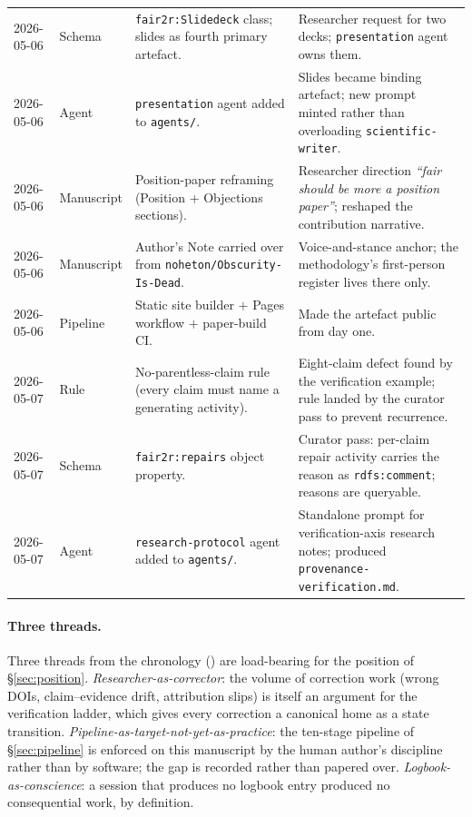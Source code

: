 \begin{longtable}{@{}p{1.55cm}p{1.4cm}p{4.2cm}p{6.6cm}@{}}
2026-05-06 & Schema     & \texttt{fair2r:Slidedeck} class; slides as fourth primary artefact. & Researcher request for two decks; \texttt{presentation} agent owns them. \\
2026-05-06 & Agent      & \texttt{presentation} agent added to \texttt{agents/}. & Slides became binding artefact; new prompt minted rather than overloading \texttt{scientific-writer}. \\
2026-05-06 & Manuscript & Position-paper reframing (Position + Objections sections). & Researcher direction \emph{``fair should be more a position paper''}; reshaped the contribution narrative. \\
2026-05-06 & Manuscript & Author's Note carried over from \texttt{noheton/Obscurity-Is-Dead}. & Voice-and-stance anchor; the methodology's first-person register lives there only. \\
2026-05-06 & Pipeline   & Static site builder \(+\) Pages workflow \(+\) paper-build CI. & Made the artefact public from day one. \\
2026-05-07 & Rule       & No-parentless-claim rule (every claim must name a generating activity). & Eight-claim defect found by the verification example; rule landed by the curator pass to prevent recurrence. \\
2026-05-07 & Schema     & \texttt{fair2r:repairs} object property. & Curator pass: per-claim repair activity carries the reason as \texttt{rdfs:comment}; reasons are queryable. \\
2026-05-07 & Agent      & \texttt{research-protocol} agent added to \texttt{agents/}. & Standalone prompt for verification-axis research notes; produced \texttt{provenance-verification.md}. \\
\end{longtable}

\paragraph{Three threads.}
Three threads from the chronology
() are load-bearing for the
position of \S\ref{sec:position}.
\emph{Researcher-as-corrector}: the volume of correction work
(wrong DOIs, claim--evidence drift, attribution slips) is itself
an argument for the verification ladder, which gives every
correction a canonical home as a state transition.
\emph{Pipeline-as-target-not-yet-as-practice}: the ten-stage
pipeline of \S\ref{sec:pipeline} is enforced on this manuscript
by the human author's discipline rather than by software; the
gap is recorded rather than papered over.
\emph{Logbook-as-conscience}: a session that produces no logbook
entry produced no consequential work, by definition.
